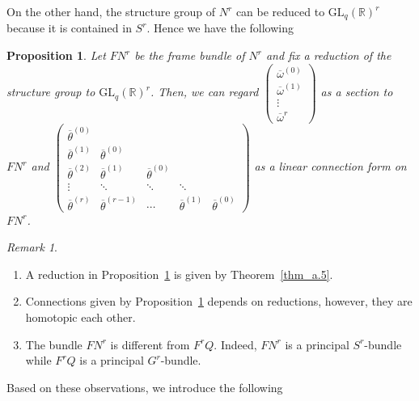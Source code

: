 \documentclass[12pt]{amsart}
\newcommand{\CF}{{\mathcal F}}
\newcommand{\R}{{\mathbb R}}
\newcommand{\GL}{\mathrm{GL}}
\newtheorem{proposition}[theorem]{Proposition}
\theoremstyle{definition}
\theoremstyle{remark}
\newtheorem{remark}[theorem]{Remark}
\begin{document}
On the other hand, the structure group of $N^r$ can be reduced to $\GL_q(\R)^r$ because it is contained in $S^r$.
Hence we have the following

\begin{proposition}
\label{prop6.6}
Let $FN^r$ be the frame bundle of $N^r$ and fix a reduction of the structure group to $\GL_q(\R)^r$.
Then, we can regard $\begin{pmatrix}
\overline{\omega}^{(0)} \\ \overline{\omega}^{(1)} \\ \vdots \\ \overline{\omega}^{r}\end{pmatrix}$ as a section to $FN^r$ and $\begin{pmatrix}
\overline{\theta}^{(0)}\\
\overline{\theta}^{(1)} & \overline{\theta}^{(0)}\\
\overline{\theta}^{(2)} & \overline{\theta}^{(1)} & \overline{\theta}^{(0)}\\
\vdots & \ddots & \ddots & \ddots\\
\overline{\theta}^{(r)} & \overline{\theta}^{(r-1)} & \cdots & \overline{\theta}^{(1)} & \overline{\theta}^{(0)}
\end{pmatrix}$ as a linear connection form on $FN^r$.
\end{proposition}

\begin{remark}
\begin{enumerate}
\item
A reduction in Proposition~\ref{prop6.6} is given by Theorem~\ref{thm_a.5}.
\item
Connections given by Proposition~\ref{prop6.6} depends on reductions, however, they are homotopic each other.
\item
The bundle $FN^r$ is different from $F^rQ$.
Indeed, $FN^r$ is a principal $S^r$-bundle while $F^rQ$ is a principal $G^r$-bundle.
\end{enumerate}
\end{remark}

Based on these observations, we introduce the following
\end{document}

